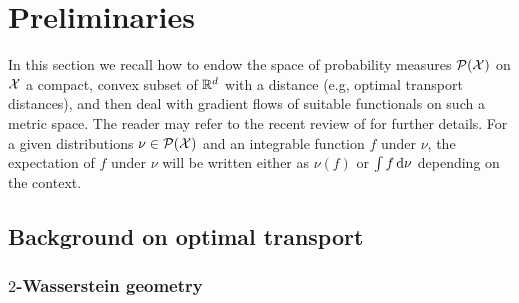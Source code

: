 
\section{Preliminaries}\label{sec:preliminaries}

In this section we recall how to endow the space of probability measures $\mathcal{P}({{\mathcal X}})$ on ${{\mathcal X}}$ a compact, convex subset of ${{\mathbb R}}^d$ with a distance (e.g, optimal transport distances), and then deal with gradient flows of suitable functionals on such a metric space. The reader may refer to the recent review of \cite{santambrogio2017euclidean} for further details. For a given distributions $\nu\in\mathcal{P}({{\mathcal X}})$ and an integrable function $f$ under $\nu$, the expectation of $f$ under $\nu$ will be written either as $\nu(f)$ or $\int f \mathop{}\!\mathrm{d}\nu$ depending on the context. 

\subsection{Background on optimal transport}

\subsubsection{$2$-Wasserstein geometry}\label{subsec:wasserstein_flow}

